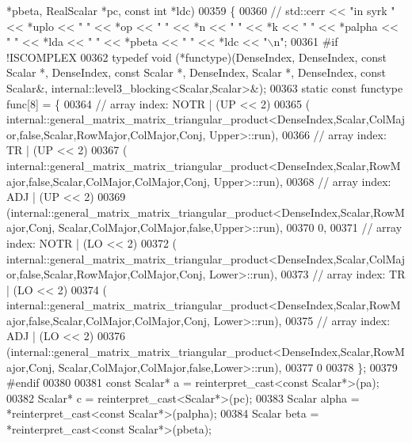 \begin{DoxyCode}
      *pbeta, RealScalar *pc, \textcolor{keyword}{const} \textcolor{keywordtype}{int} *ldc)
00359 \{
00360 \textcolor{comment}{//   std::cerr << "in syrk " << *uplo << " " << *op << " " << *n << " " << *k << " " << *palpha << " " <<
       *lda << " " << *pbeta << " " << *ldc << "\(\backslash\)n";}
00361 \textcolor{preprocessor}{  #if !ISCOMPLEX}
00362   \textcolor{keyword}{typedef} void (*functype)(DenseIndex, DenseIndex, \textcolor{keyword}{const} Scalar *, DenseIndex, \textcolor{keyword}{const} Scalar *, DenseIndex, 
      Scalar *, DenseIndex, \textcolor{keyword}{const} Scalar&, internal::level3\_blocking<Scalar,Scalar>&);
00363   \textcolor{keyword}{static} \textcolor{keyword}{const} functype func[8] = \{
00364     \textcolor{comment}{// array index: NOTR  | (UP << 2)}
00365     (
      internal::general\_matrix\_matrix\_triangular\_product<DenseIndex,Scalar,ColMajor,false,Scalar,RowMajor,ColMajor,Conj, Upper>::run),
00366     \textcolor{comment}{// array index: TR    | (UP << 2)}
00367     (
      internal::general\_matrix\_matrix\_triangular\_product<DenseIndex,Scalar,RowMajor,false,Scalar,ColMajor,ColMajor,Conj, Upper>::run),
00368     \textcolor{comment}{// array index: ADJ   | (UP << 2)}
00369     (internal::general\_matrix\_matrix\_triangular\_product<DenseIndex,Scalar,RowMajor,Conj,
       Scalar,ColMajor,ColMajor,false,Upper>::run),
00370     0,
00371     \textcolor{comment}{// array index: NOTR  | (LO << 2)}
00372     (
      internal::general\_matrix\_matrix\_triangular\_product<DenseIndex,Scalar,ColMajor,false,Scalar,RowMajor,ColMajor,Conj, Lower>::run),
00373     \textcolor{comment}{// array index: TR    | (LO << 2)}
00374     (
      internal::general\_matrix\_matrix\_triangular\_product<DenseIndex,Scalar,RowMajor,false,Scalar,ColMajor,ColMajor,Conj, Lower>::run),
00375     \textcolor{comment}{// array index: ADJ   | (LO << 2)}
00376     (internal::general\_matrix\_matrix\_triangular\_product<DenseIndex,Scalar,RowMajor,Conj,
       Scalar,ColMajor,ColMajor,false,Lower>::run),
00377     0
00378   \};
00379 \textcolor{preprocessor}{  #endif}
00380 
00381   \textcolor{keyword}{const} Scalar* a = \textcolor{keyword}{reinterpret\_cast<}\textcolor{keyword}{const }Scalar*\textcolor{keyword}{>}(pa);
00382   Scalar* c = \textcolor{keyword}{reinterpret\_cast<}Scalar*\textcolor{keyword}{>}(pc);
00383   Scalar alpha = *\textcolor{keyword}{reinterpret\_cast<}\textcolor{keyword}{const }Scalar*\textcolor{keyword}{>}(palpha);
00384   Scalar beta  = *\textcolor{keyword}{reinterpret\_cast<}\textcolor{keyword}{const }Scalar*\textcolor{keyword}{>}(pbeta);

\end{DoxyCode}
